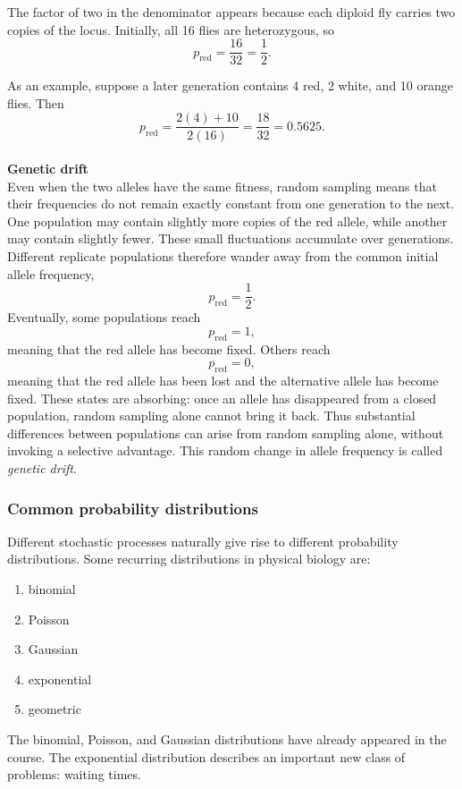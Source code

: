 The factor of two in the denominator appears because each diploid fly carries two copies of the locus.
Initially, all 16 flies are heterozygous, so
\[
    p_{\mathrm{red}} = \frac{16}{32} = \frac{1}{2}.
\]

As an example, suppose a later generation contains 4 red, 2 white, and 10 orange flies.
Then
\[
    p_{\mathrm{red}} = \frac{2(4)+10}{2(16)} = \frac{18}{32} = 0.5625.
\]
% 
\medskip
\\
\textbf{Genetic drift}
\\
Even when the two alleles have the same fitness, random sampling means that their frequencies do not remain exactly constant from one generation to the next.
One population may contain slightly more copies of the red allele, while another may contain slightly fewer.
These small fluctuations accumulate over generations.
Different replicate populations therefore wander away from the common initial allele frequency,
\[
    p_{\mathrm{red}}=\frac{1}{2}.
\]
Eventually, some populations reach
\[
    p_{\mathrm{red}}=1,
\]
meaning that the red allele has become fixed.
Others reach
\[
    p_{\mathrm{red}}=0,
\]
meaning that the red allele has been lost and the alternative allele has become fixed.
These states are absorbing: once an allele has disappeared from a closed population, random sampling alone cannot bring it back.
Thus substantial differences between populations can arise from random sampling alone, without invoking a selective advantage.
This random change in allele frequency is called \emph{genetic drift}.

\subsubsection{Common probability distributions}

Different stochastic processes naturally give rise to different probability distributions.
Some recurring distributions in physical biology are:
\begin{enumerate}
    \item binomial
    \item Poisson
    \item Gaussian
    \item exponential
    \item geometric
\end{enumerate}

The binomial, Poisson, and Gaussian distributions have already appeared in the course.
The exponential distribution describes an important new class of problems: waiting times.

